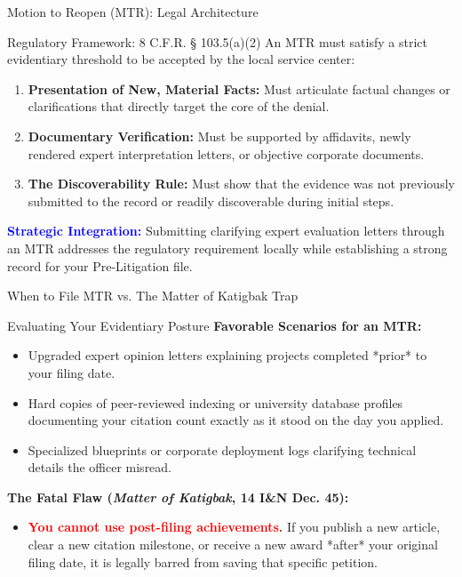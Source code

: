 \documentclass[11pt]{beamer}
\begin{document}
	\begin{frame}{Motion to Reopen (MTR): Legal Architecture}
		\scriptsize
		\begin{block}{Regulatory Framework: 8 C.F.R. § 103.5(a)(2)}
			An MTR must satisfy a strict evidentiary threshold to be accepted by the local service center:
			\begin{enumerate}
				\item \textbf{Presentation of New, Material Facts:} Must articulate factual changes or clarifications that directly target the core of the denial.
				\item \textbf{Documentary Verification:} Must be supported by affidavits, newly rendered expert interpretation letters, or objective corporate documents.
				\item \textbf{The Discoverability Rule:} Must show that the evidence was not previously submitted to the record or readily discoverable during initial steps.
			\end{enumerate}
			\vspace{0.1cm}
			\textcolor{blue}{\textbf{Strategic Integration:}} Submitting clarifying expert evaluation letters through an MTR addresses the regulatory requirement locally while establishing a strong record for your Pre-Litigation file.
		\end{block}
	\end{frame}
	
	\begin{frame}{When to File MTR vs. The Matter of Katigbak Trap}
		\scriptsize
		\begin{block}{Evaluating Your Evidentiary Posture}
			\textbf{Favorable Scenarios for an MTR:}
			\begin{itemize}
				\item Upgraded expert opinion letters explaining projects completed *prior* to your filing date.
				\item Hard copies of peer-reviewed indexing or university database profiles documenting your citation count exactly as it stood on the day you applied.
				\item Specialized blueprints or corporate deployment logs clarifying technical details the officer misread.
			\end{itemize}
			\textbf{The Fatal Flaw (\textit{Matter of Katigbak}, 14 I\&N Dec. 45):}
			\begin{itemize}
				\item \textcolor{red}{\textbf{You cannot use post-filing achievements.}} If you publish a new article, clear a new citation milestone, or receive a new award *after* your original filing date, it is legally barred from saving that specific petition.
			\end{itemize}
		\end{block}
	\end{frame}
	
\end{document}
